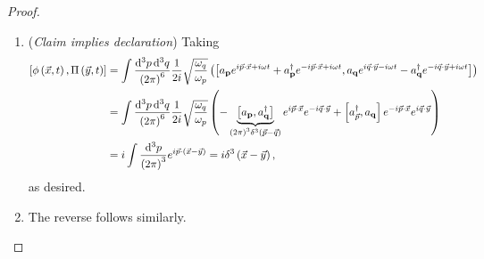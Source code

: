 \begin{proof}
    \begin{enumerate}[label=\arabic*)]
        \item (\textit{Claim implies declaration}) Taking
            \begin{align}
                \left[ \phi \left( \vec{x},t \right) , \Pi \left( \vec{y},t \right)  \right] &= \int \frac{\dd{^3p} \dd{^3q}}{\left( 2\pi \right)^{6}} \frac{1}{2i} \sqrt{\frac{\omega_q}{\omega_p}}\left(  \left[ a_{\vb{p}} e^{i \vec{p} \cdot \vec{x} + i \omega t} + a^{\dag}_{\vb{p}} e^{-i \vec{p} \cdot \vec{x} + i \omega t}, a_{\vb{q}} e^{i \vec{q} \cdot \vec{y} - i \omega t} - a^{\dag}_{\vb{q}} e^{-i \vec{q} \cdot \vec{y} + i \omega t}  \right]  \right) \\
&= \int \frac{\dd{^3p} \dd{^3q}}{\left( 2\pi \right)^{6}} \frac{1}{2i} \sqrt{\frac{\omega_q}{\omega_p}} \left( - \underbrace{\left[ a_{\vb{p}}, a^{\dag}_{\vb{q}} \right]}_{\left( 2\pi \right)^3 \delta^{3}\left( \vec{p} - \vec{q} \right) } e^{i \vec{p} \cdot \vec{x}} e^{-i \vec{q} \cdot \vec{y}} + \left[ a^{\dag}_{\vec{p}}, a_{\vb{q}} \right] e^{-i \vec{p} \cdot \vec{x}} e^{i \vec{q} \cdot \vec{y}}  \right) \\
&= i\int \frac{\dd{^3p}}{\left( 2\pi \right)^{3}} e^{i \vec{p} \cdot \left( \vec{x} - \vec{y} \right) } = i \delta^{3}\left( \vec{x} - \vec{y} \right)
            ,\end{align}
            as desired.
        \item The reverse follows similarly.
    \end{enumerate}
\end{proof}


